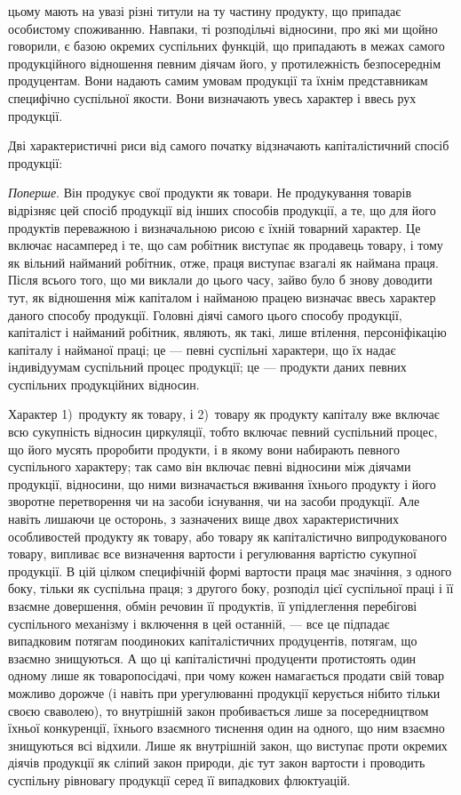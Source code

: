 \parcont{}  %
цьому мають на увазі різні титули на ту частину продукту, що припадає
особистому споживанню. Навпаки, ті розподільчі відносини, про які ми щойно
говорили, є базою окремих суспільних функцій, що припадають в межах самого
продукційного відношення певним діячам його, у протилежність безпосереднім
продуцентам. Вони надають самим умовам продукції та їхнім представникам специфічно
суспільної якости. Вони визначають увесь характер і ввесь рух продукції.

Дві характеристичні риси від самого початку відзначають капіталістичний
спосіб продукції:

\emph{Поперше}. Він продукує свої продукти як товари. Не продукування товарів
відрізняє цей спосіб продукції від інших способів продукції, а те, що для
його продуктів переважною і визначальною рисою є їхній товарний характер. Це
включає насамперед і те, що сам робітник виступає як продавець товару, і тому
як вільний найманий робітник, отже, праця виступає взагалі як наймана праця.
Після всього того, що ми виклали до цього часу, зайво було б знову доводити
тут, як відношення між капіталом і найманою працею визначає ввесь характер даного
способу продукції. Головні діячі самого цього способу продукції, капіталіст і
найманий робітник, являють, як такі, лише втілення, персоніфікацію капіталу і
найманої праці; це — певні суспільні характери, що їх надає індивідуумам суспільний
процес продукції; це — продукти даних певних суспільних продукційних
відносин.

Характер 1)~продукту як товару, і 2)~товару як продукту капіталу вже
включає всю сукупність відносин циркуляції, тобто включає певний суспільний
процес, що його мусять проробити продукти, і в якому вони набирають
певного суспільного характеру; так само він включає певні відносини між
діячами продукції, відносини, що ними визначається вживання їхнього продукту
і його зворотне перетворення чи на засоби існування, чи на засоби
продукції. Але навіть лишаючи це осторонь, з зазначених вище двох характеристичних
особливостей продукту як товару, або товару як капіталістично
випродукованого товару, випливає все визначення вартости і регулювання вартістю
сукупної продукції. В цій цілком специфічній формі вартости праця має
значіння, з одного боку, тільки як суспільна праця; з другого боку, розподіл
цієї суспільної праці і її взаємне довершення, обмін речовин її продуктів, її
упідлеглення перебігові суспільного механізму і включення в цей останній, —
все це підпадає випадковим потягам поодиноких капіталістичних продуцентів,
потягам, що взаємно знищуються. А що ці капіталістичні продуценти протистоять
один одному лише як товаропосідачі, при чому кожен намагається
продати свій товар можливо дорожче (і навіть при урегулюванні продукції
керується нібито тільки своєю сваволею), то внутрішній закон пробивається
лише за посередництвом їхньої конкуренції, їхнього взаємного тиснення один
на одного, що ним взаємно знищуються всі відхили. Лише як внутрішній
закон, що виступає проти окремих діячів продукції як сліпий закон природи,
діє тут закон вартости і проводить суспільну рівновагу продукції серед її випадкових
флюктуацій.

